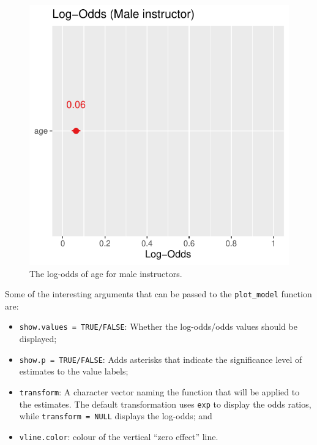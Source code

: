 \documentclass[
  letterpaper,
  DIV=11,
  numbers=noendperiod]{scrartcl}
\providecommand{\tightlist}{%
  \setlength{\itemsep}{0pt}\setlength{\parskip}{0pt}}\usepackage{longtable,booktabs,array}
\begin{document}
\begin{figure}[H]

{\centering \includegraphics{index_files/figure-pdf/unnamed-chunk-15-1.pdf}

}

\caption{The log-odds of age for male instructors.}

\end{figure}%

Some of the interesting arguments that can be passed to the
\texttt{plot\_model} function are:

\begin{itemize}
\tightlist
\item
  \texttt{show.values\ =\ TRUE/FALSE}: Whether the log-odds/odds values
  should be displayed;
\item
  \texttt{show.p\ =\ TRUE/FALSE}: Adds asterisks that indicate the
  significance level of estimates to the value labels;
\item
  \texttt{transform}: A character vector naming the function that will
  be applied to the estimates. The default transformation uses
  \texttt{exp} to display the odds ratios, while
  \texttt{transform\ =\ NULL} displays the log-odds; and
\item
  \texttt{vline.color}: colour of the vertical ``zero effect'' line.
\end{itemize}
\end{document}
